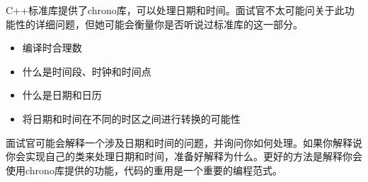 
C++标准库提供了chrono库，可以处理日期和时间。面试官不太可能问关于此功能性的详细问题，但她可能会衡量你是否听说过标准库的这一部分。


\begin{itemize}
\item
编译时合理数

\item
什么是时间段、时钟和时间点

\item
什么是日期和日历

\item
将日期和时间在不同的时区之间进行转换的可能性
\end{itemize}


面试官可能会解释一个涉及日期和时间的问题，并询问你如何处理。如果你解释说你会实现自己的类来处理日期和时间，准备好解释为什么。更好的方法是解释你会使用chrono库提供的功能，代码的重用是一个重要的编程范式。

